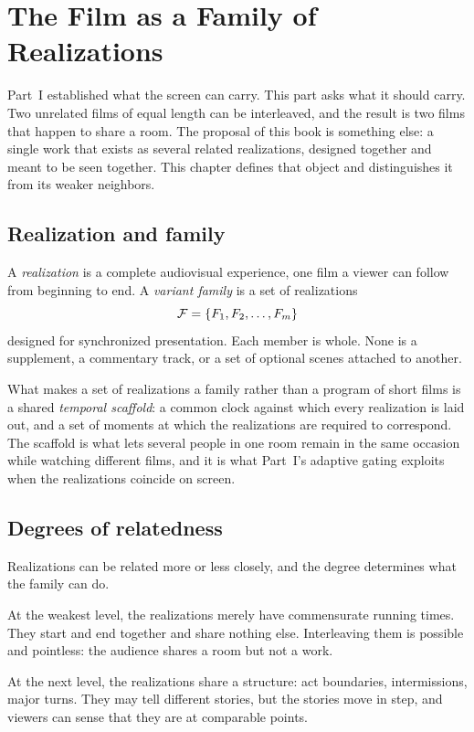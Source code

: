 \chapter{The Film as a Family of Realizations}\label{ch:family}

Part~I established what the screen can carry. This part asks what it should carry. Two unrelated films of equal length can be interleaved, and the result is two films that happen to share a room. The proposal of this book is something else: a single work that exists as several related realizations, designed together and meant to be seen together. This chapter defines that object and distinguishes it from its weaker neighbors.

\section{Realization and family}

A \emph{realization} is a complete audiovisual experience, one film a viewer can follow from beginning to end. A \emph{variant family} is a set of realizations
\begin{equation}
\mathcal{F}=\{F_1,F_2,\ldots,F_m\}
\end{equation}
designed for synchronized presentation. Each member is whole. None is a supplement, a commentary track, or a set of optional scenes attached to another.

What makes a set of realizations a family rather than a program of short films is a shared \emph{temporal scaffold}: a common clock against which every realization is laid out, and a set of moments at which the realizations are required to correspond. The scaffold is what lets several people in one room remain in the same occasion while watching different films, and it is what Part~I's adaptive gating exploits when the realizations coincide on screen.

\section{Degrees of relatedness}

Realizations can be related more or less closely, and the degree determines what the family can do.

At the weakest level, the realizations merely have commensurate running times. They start and end together and share nothing else. Interleaving them is possible and pointless: the audience shares a room but not a work.

At the next level, the realizations share a structure: act boundaries, intermissions, major turns. They may tell different stories, but the stories move in step, and viewers can sense that they are at comparable points.

